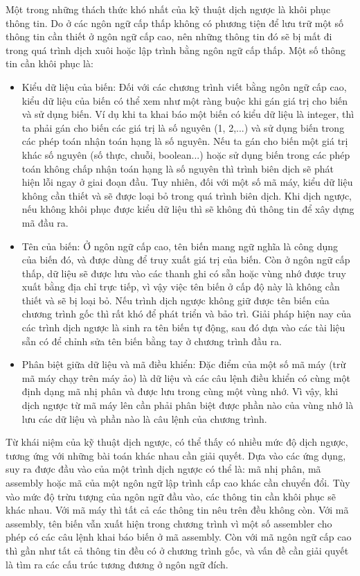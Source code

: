 Một trong những thách thức khó nhất của kỹ thuật dịch ngược là khôi phục thông tin. Do ở các ngôn ngữ cấp thấp không có phương tiện để lưu trữ một số thông tin cần thiết ở ngôn ngữ cấp cao, nên những thông tin đó sẽ bị mất đi trong quá trình dịch xuôi hoặc lập trình bằng ngôn ngữ cấp thấp. Một số thông tin cần khôi phục là:
\begin{itemize}
	\item Kiểu dữ liệu của biến: Đối với các chương trình viết bằng ngôn ngữ cấp cao, kiểu dữ liệu của biến có thể xem như một ràng buộc khi gán giá trị cho biến và sử dụng biến. Ví dụ khi ta khai báo một biến có kiểu dữ liệu là integer, thì ta phải gán cho biến các giá trị là số nguyên (1, 2,...) và sử dụng biến trong các phép toán nhận toán hạng là số nguyên. Nếu ta gán cho biến một giá trị khác số nguyên (số thực, chuỗi, boolean...) hoặc sử dụng biến trong các phép toán không chấp nhận toán hạng là số nguyên thì trình biên dịch sẽ phát hiện lỗi ngay ở giai đoạn đầu. Tuy nhiên, đối với một số mã máy, kiểu dữ liệu không cần thiết và sẽ được loại bỏ trong quá trình biên dịch. Khi dịch ngược, nếu không khôi phục được kiểu dữ liệu thì sẽ không đủ thông tin để xây dựng mã đầu ra.
	
	\item Tên của biến: Ở ngôn ngữ cấp cao, tên biến mang ngữ nghĩa là công dụng của biến đó, và được dùng để truy xuất giá trị của biến. Còn ở ngôn ngữ cấp thấp, dữ liệu sẽ được lưu vào các thanh ghi có sẵn hoặc vùng nhớ được truy xuất bằng địa chỉ trực tiếp, vì vậy việc tên biến ở cấp độ này là không cần thiết và sẽ bị loại bỏ. Nếu trình dịch ngược không giữ được tên biến của chương trình gốc thì rất khó để phát triển và bảo trì. Giải pháp hiện nay của các trình dịch ngược là sinh ra tên biến tự động, sau đó dựa vào các tài liệu sẵn có để chỉnh sửa tên biến bằng tay ở chương trình đầu ra. \cite{ssavan}
	
	\item Phân biệt giữa dữ liệu và mã điều khiển: Đặc điểm của một số mã máy (trừ mã máy chạy trên máy ảo) là dữ liệu và các câu lệnh điều khiển có cùng một định dạng mã nhị phân và được lưu trong cùng một vùng nhớ. Vì vậy, khi dịch ngược từ mã máy lên cần phải phân biệt được phần nào của vùng nhớ là lưu các dữ liệu và phần nào là câu lệnh của chương trình.
\end{itemize}

Từ khái niệm của kỹ thuật dịch ngược, có thể thấy có nhiều mức độ dịch ngược, tương ứng với những bài toán khác nhau cần giải quyết. Dựa vào các ứng dụng, suy ra được đầu vào của một trình dịch ngược có thể là: mã nhị phân, mã assembly hoặc mã của một ngôn ngữ lập trình cấp cao khác cần chuyển đổi. Tùy vào mức độ trừu tượng của ngôn ngữ đầu vào, các thông tin cần khôi phục sẽ khác nhau. Với mã máy thì tất cả các thông tin nêu trên đều không còn. Với mã assembly, tên biến vẫn xuất hiện trong chương trình vì một số assembler cho phép có các câu lệnh khai báo biến ở mã assembly. Còn với mã ngôn ngữ cấp cao thì gần như tất cả thông tin đều có ở chương trình gốc, và vấn đề cần giải quyết là tìm ra các cấu trúc tương đương ở ngôn ngữ đích.

